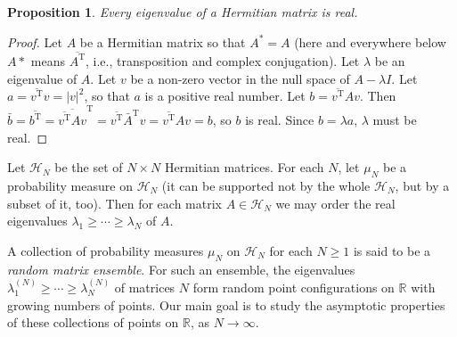 \documentclass[letterpaper,11pt,oneside,reqno]{amsart}
\numberwithin{equation}{section}
\newtheorem{proposition}{Proposition}[section]
\theoremstyle{definition}
\begin{document}
\begin{proposition}
Every eigenvalue of a Hermitian matrix is real.
\end{proposition}
\begin{proof}
Let $A$ be a Hermitian matrix so that $A^*=A$ (here and everywhere below
$A*$ means $\overline{A^{\text{T}}}$, i.e., transposition and complex conjugation).
Let $\lambda$ be an eigenvalue of $A$.  Let $v$ be a non-zero vector in the null
space of $A-\lambda I$.  Let $a=\overline{ v^{\text{T}}}v=|v|^2$, so
that $a$ is a positive real number.  Let $b=\overline{ v^{\text{T}}}A
v$.  Then $\bar b=\overline{ b^{\text{T}}}=\overline{\overline{
v^{\text{T}}}Av}^{\text{T}}=\overline{
v^{\text{T}}}\bar A^{\text{T}} v=\overline{
v^{\text{T}}}Av=b$, so $b$ is real.  Since $b=\lambda a$, $\lambda$
must be real. 
\end{proof}

Let $\mathcal H_N$ be the set of $N\times N$ Hermitian matrices.  For each
$N$, let $\mu_N$ be a probability measure on $\mathcal H_N$ (it can be
supported not by  the whole $\mathcal H_N$, but by a subset of it, too).  Then
for each matrix $A\in \mathcal H_N$ we may order the real eigenvalues
$\lambda_1\geq \cdots \geq \lambda_N$ of $A$.

A collection of probability measures $\mu_N$ on $\mathcal H_N$ for each
$N\ge1$ is said to be a \emph{random matrix ensemble}. For such an ensemble,
the eigenvalues $\lambda_1^{(N)}\geq \cdots \geq \lambda_N^{(N)}$ of matrices
$N$ form random point configurations on $\mathbb{R}$ with growing numbers of points.
Our main goal is to study the asymptotic properties of these collections of points on $\mathbb{R}$,
as $N\to\infty$.










\end{document}
